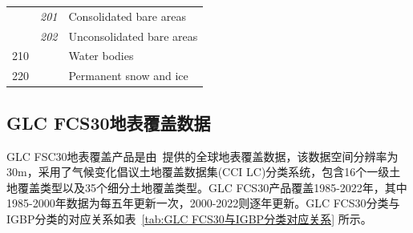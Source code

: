 \begin{table}[htbp]
\begin{tabular}{lll}
    & \textit{201}         & Consolidated bare areas                                             \\
    & \textit{202}         & Unconsolidated bare areas                                           \\
    210                      &                      & Water bodies                                                        \\
    220                      &                      & Permanent snow and ice                                              \\ \bottomrule
  \end{tabular}
\end{table}

\subsection{GLC FCS30地表覆盖数据}\label{GLC FCS30地表覆盖数据}
GLC FSC30地表覆盖产品是由~\citet{zhang2023glc_fcs30d}提供的全球地表覆盖数据，该数据空间分辨率为30m，采用了气候变化倡议土地覆盖数据集(CCI LC)分类系统，包含16个一级土地覆盖类型以及35个细分土地覆盖类型。GLC FCS30产品覆盖1985-2022年，其中1985-2000年数据为每五年更新一次，2000-2022则逐年更新。GLC FCS30分类与IGBP分类的对应关系如表~\ref{tab:GLC FCS30与IGBP分类对应关系} 所示。
